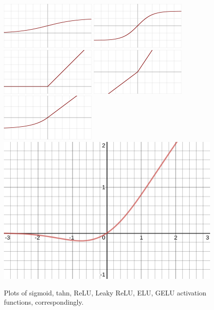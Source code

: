 \documentclass[a4paper]{article}
\theoremstyle{definition}
\theoremstyle{plain}
\begin{document}
\begin{figure}[H]
    \centering
    \includegraphics[scale=0.6]{figure/sigmoid.png}
    \includegraphics[scale=0.6]{figure/tanh.png}
    \includegraphics[scale=0.6]{figure/relu.png}
    \includegraphics[scale=0.6]{figure/leakyrelu.png}
    \includegraphics[scale=0.6]{figure/elu.png}
    \includegraphics[scale=0.08]{figure/gelu.png}
    \caption{Plots of sigmoid, tahn, ReLU, Leaky ReLU, ELU, GELU activation functions, correspondingly.}
\end{figure}
\end{document}
